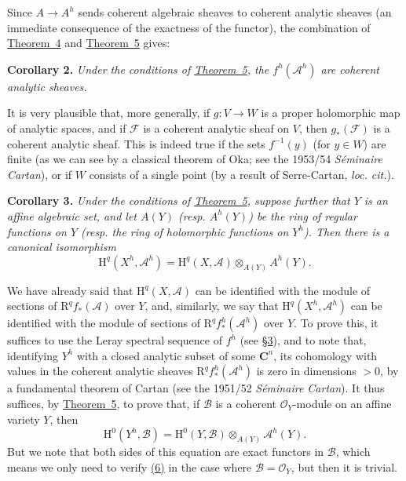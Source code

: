 \documentclass{article}
\newenvironment{itenv}[1]
  {\smallskip\noindent\textbf{#1.}\itshape}
  {\smallskip}
\newcommand{\scr}[1]{{\mathscr{#1}}}
\newcommand{\HH}{\mathrm{H}}
\newcommand{\RR}{\mathrm{R}}
\newcommand{\oldpage}[1]{\marginpar{\footnotesize$\Big\vert$ \textit{p.~#1}}}
\begin{document}
Since $A\to A^h$ sends coherent algebraic sheaves to coherent analytic sheaves (an immediate consequence of the exactness of the functor), the combination of \hyperref[theorem4]{Theorem~4} and \hyperref[theorem5]{Theorem~5} gives:

\begin{itenv}{Corollary 2}
\label{corollary2-5}
  Under the conditions of \hyperref[theorem5]{Theorem~5}, the $f^h(\scr{A}^h)$ are coherent analytic sheaves.
\end{itenv}

\oldpage{2-10}
It is very plausible that, more generally, if $g\colon V\to W$ is a proper holomorphic map of analytic spaces, and if $\scr{F}$ is a coherent analytic sheaf on $V$, then $g_*(\scr{F})$ is a coherent analytic sheaf.
This is indeed true if the sets $f^{-1}(y)$ (for $y\in W$) are finite (as we can see by a classical theorem of Oka; see the 1953/54 \emph{S\'{e}minaire Cartan}), or if $W$ consists of a single point (by a result of Serre-Cartan, \emph{loc. cit.}).

\begin{itenv}{Corollary 3}
\label{corollary3-5}
  Under the conditions of \hyperref[theorem5]{Theorem~5}, suppose further that $Y$ is an \emph{affine} algebraic set, and let $A(Y)$ (resp. $A^h(Y)$) be the ring of regular functions on $Y$ (resp. the ring of holomorphic functions on $Y^h$).
  Then there is a canonical isomorphism
  \[
  \label{equation5}
    \HH^q(X^h,\scr{A}^h) = \HH^q(X,\scr{A})\otimes_{A(Y)}A^h(Y).
    \tag{5}
  \]
\end{itenv}

We have already said that $\HH^q(X,\scr{A})$ can be identified with the module of sections of $\RR^qf_*(\scr{A})$ over $Y$, and, similarly, we say that $\HH^q(X^h,\scr{A}^h)$ can be identified with the module of sections of $\RR^qf_*^h(\scr{A}^h)$ over $Y$.
To prove this, it suffices to use the Leray spectral sequence of $f^h$ (see \hyperref[section3]{\S3}), and to note that, identifying $Y^h$ with a closed analytic subset of some $\mathbf{C}^n$, its cohomology with values in the coherent analytic sheaves $\RR^qf_*^h(\scr{A}^h)$ is zero in dimensions $>0$, by a fundamental theorem of Cartan (see the 1951/52 \emph{S\'{e}minaire Cartan}).
It thus suffices, by \hyperref[theorem5]{Theorem~5}, to prove that, if $\scr{B}$ is a coherent $\scr{O}_Y$-module on an affine variety $Y$, then
\[
\label{equation6}
  \HH^0(Y^h,\scr{B}) = \HH^0(Y,\scr{B})\otimes_{A(Y)}\scr{A}^h(Y).
  \tag{6}
\]
But we note that both sides of this equation are exact functors in $\scr{B}$, which means we only need to verify \hyperref[equation6]{(6)} in the case where $\scr{B}=\scr{O}_Y$, but then it is trivial.
\end{document}
